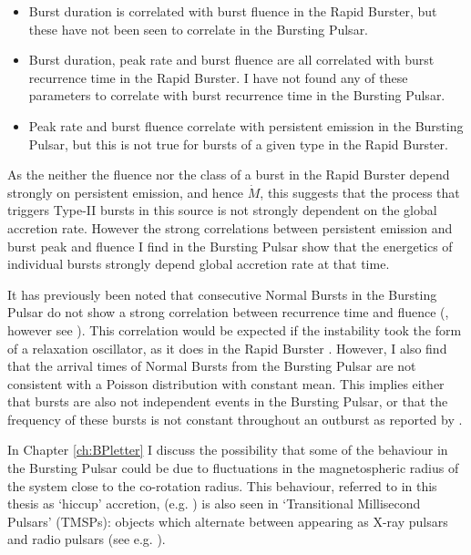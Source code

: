 \begin{itemize}
\item Burst duration is correlated with burst fluence in the Rapid Burster, but these have not been seen to correlate in the Bursting Pulsar.
\item Burst duration, peak rate and burst fluence are all correlated with burst recurrence time in the Rapid Burster.  I have not found any of these parameters to correlate with burst recurrence time in the Bursting Pulsar.
\item Peak rate and burst fluence correlate with persistent emission in the Bursting Pulsar, but this is not true for bursts of a given type in the Rapid Burster.
\end{itemize}

\par As the neither the fluence nor the class of a burst in the Rapid Burster depend strongly on persistent emission, and hence $\dot{M}$, this suggests that the process that triggers Type-II bursts in this source is not strongly dependent on the global accretion rate.  However the strong correlations between persistent emission and burst peak and fluence I find in the Bursting Pulsar show that the energetics of individual bursts strongly depend global accretion rate at that time.
\par It has previously been noted that consecutive Normal Bursts in the Bursting Pulsar do not show a strong correlation between recurrence time and fluence (\citealp{Taam_Evo,Lewin_BP}, however see \citealp{Aptekar_OscRel}).  This correlation would be expected if the instability took the form of a relaxation oscillator, as it does in the Rapid Burster \citep{Lewin_TypeII}.  However, I also find that the arrival times of Normal Bursts from the Bursting Pulsar are not consistent with a Poisson distribution with constant mean.  This implies either that bursts are also not independent events in the Bursting Pulsar, or that the frequency of these bursts is not constant throughout an outburst as reported by \citet{Aptekar_Recur}.
\par In Chapter \ref{ch:BPletter} I discuss the possibility that some of the behaviour in the Bursting Pulsar could be due to fluctuations in the magnetospheric radius of the system close to the co-rotation radius.  This behaviour, referred to in this thesis as `hiccup' accretion, (e.g. \citealp{Bogdanov_TMSPVar,Ferrigno_TMSPVar}) is also seen in `Transitional Millisecond Pulsars' (TMSPs): objects which alternate between appearing as X-ray pulsars and radio pulsars (see e.g. \citealp{Archibald_Link,Papitto_Swings}).

